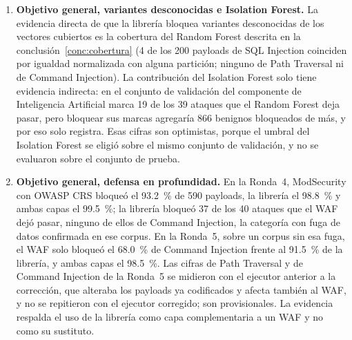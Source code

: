 \begin{enumerate}
    \item \textbf{Objetivo general, variantes desconocidas e Isolation Forest.}\label{conc:variantes}
    La evidencia directa de que la librería bloquea variantes desconocidas de los vectores cubiertos
    es la cobertura del Random Forest descrita en la conclusión~\ref{conc:cobertura} (4 de los 200 payloads de SQL
    Injection coinciden por igualdad normalizada con alguna partición; ninguno de Path Traversal ni
    de Command Injection). La contribución del Isolation Forest solo tiene evidencia indirecta: en
    el conjunto de validación del componente de Inteligencia Artificial \cite{valenzuela2026ia} marca 19 de los 39 ataques
    que el Random Forest deja pasar, pero bloquear sus marcas agregaría 866 benignos bloqueados de
    más, y por eso solo registra. Esas cifras son optimistas, porque el umbral del Isolation Forest
    se eligió sobre el mismo conjunto de validación, y no se evaluaron sobre el conjunto de prueba.

    \item \textbf{Objetivo general, defensa en profundidad.}\label{conc:waf} En la Ronda~4, ModSecurity con OWASP CRS
    bloqueó el 93.2~\% de 590 payloads, la librería el 98.8~\% y ambas capas el 99.5~\%; la librería
    bloqueó 37 de los 40 ataques que el WAF dejó pasar, ninguno de ellos de Command Injection, la
    categoría con fuga de datos confirmada en ese corpus. En la Ronda~5, sobre un corpus sin esa fuga,
    el WAF solo bloqueó el 68.0~\% de Command Injection frente al 91.5~\% de la librería, y ambas
    capas el 98.5~\%. Las cifras de Path Traversal y de Command Injection de la Ronda~5 se midieron
    con el ejecutor anterior a la corrección, que alteraba los payloads ya codificados y afecta
    también al WAF, y no se repitieron con el ejecutor corregido; son provisionales. La evidencia
    respalda el uso de la librería como capa complementaria a un WAF y no como su sustituto.


\end{enumerate}
